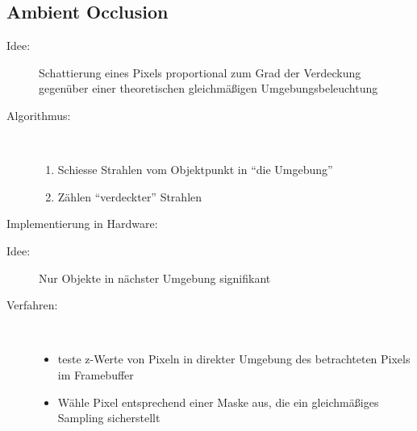 \documentclass[a4paper, 12pt]{article}
\begin{document}
\subsection{Ambient Occlusion}
\begin{description}
  \item[Idee:] Schattierung eines Pixels proportional zum Grad der Verdeckung gegenüber einer theoretischen gleichmäßigen Umgebungsbeleuchtung
  \item[Algorithmus:]~
    \begin{enumerate}
      \item Schiesse Strahlen vom Objektpunkt in ``die Umgebung''
      \item Zählen ``verdeckter'' Strahlen
    \end{enumerate}
\end{description}
Implementierung in Hardware:
\begin{description}
  \item[Idee:] Nur Objekte in nächster Umgebung signifikant
  \item[Verfahren:]~
    \begin{itemize}
      \item teste z-Werte von Pixeln in direkter Umgebung des betrachteten Pixels im Framebuffer
      \item Wähle Pixel entsprechend einer Maske aus, die ein gleichmäßiges Sampling sicherstellt
    \end{itemize}
\end{description}
\end{document}
